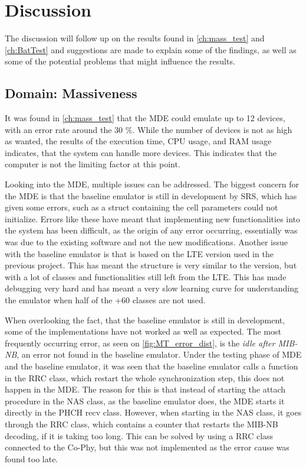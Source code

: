 \chapter{Discussion}
\label{ch:dics}
The discussion will follow up on the results found in \autoref{ch:mass_test} and \autoref{ch:BatTest} and suggestions are made to explain some of the findings, as well as some of the potential problems that might influence the results. 

\section{Domain: Massiveness}
It was found in \autoref{ch:mass_test} that the MDE could emulate up to 12 devices, with an error rate around the 30 $\%$. While the number of devices is not as high as wanted, the results of the execution time, CPU usage, and RAM usage indicates, that the system can handle more devices. This indicates that the computer is not the limiting factor at this point. 

Looking into the MDE, multiple issues can be addressed. The biggest concern for the MDE is that the baseline emulator is still in development by SRS, which has given some errors, such as a struct containing the cell parameters could not initialize. Errors like these have meant that implementing new functionalities into the system has been difficult, as the origin of any error occurring, essentially was was due to the existing software and not the new modifications. Another issue with the baseline emulator is that is based on the LTE version used in the previous project. This has meant the structure is very similar to the version, but with a lot of classes and functionalities still left from the LTE. This has made debugging very hard and has meant a very slow learning curve for understanding the emulator when half of the +60 classes are not used.

When overlooking the fact, that the baseline emulator is still in development, some of the implementations have not worked as well as expected. The most frequently occurring error, as seen on \autoref{fig:MT_error_dist}, is the \textit{idle after MIB-NB}, an error not found in the baseline emulator. Under the testing phase of MDE and the baseline emulator, it was seen that the baseline emulator calls a function in the RRC class, which restart the whole synchronization step, this does not happen in the MDE. The reason for this is that instead of starting the attach procedure in the NAS class, as the baseline emulator does, the MDE starts it directly in the PHCH recv class. However, when starting in the NAS class, it goes through the RRC class, which contains a counter that restarts the MIB-NB decoding, if it is taking too long. This can be solved by using a RRC class connected to the Co-Phy, but this was not implemented as the error cause was found too late.

